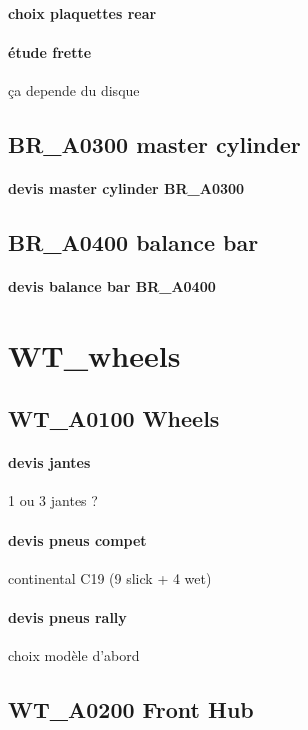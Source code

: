 		\paragraph{choix plaquettes rear} 
		\paragraph{étude frette} ça depende du disque
	\subsection*{BR\_A0300 master cylinder} 
 \par 
		\paragraph{devis master cylinder BR\_A0300} 
	\subsection*{BR\_A0400 balance bar} 
 \par 
		\paragraph{devis balance bar BR\_A0400} 
\newpage 
 \section*{WT\_wheels} 
 \par 
	\subsection*{WT\_A0100 Wheels} 
 \par 
		\paragraph{devis jantes} 1 ou 3 jantes ?
		\paragraph{devis pneus compet} continental C19 (9 slick + 4 wet) 
		\paragraph{devis pneus rally} choix modèle d'abord
	\subsection*{WT\_A0200 Front Hub} 
 \par 
